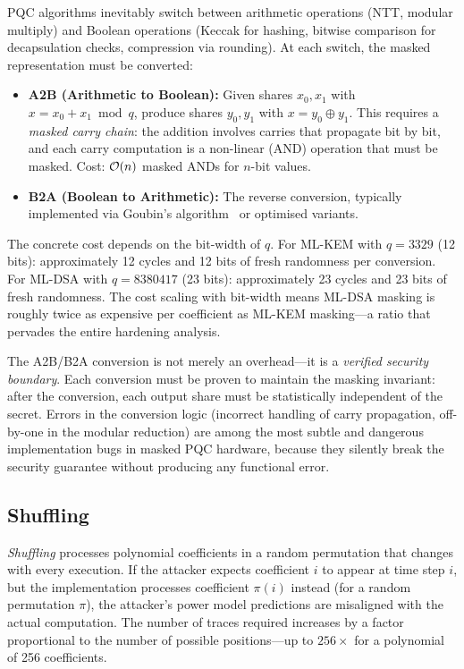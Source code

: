 PQC algorithms inevitably switch between arithmetic operations (NTT, modular multiply) and Boolean operations (Keccak for hashing, bitwise comparison for decapsulation checks, compression via rounding).  At each switch, the masked representation must be converted:

\begin{itemize}
\item \textbf{A2B (Arithmetic to Boolean):} Given shares $x_0, x_1$ with $x = x_0 + x_1 \bmod q$, produce shares $y_0, y_1$ with $x = y_0 \oplus y_1$.  This requires a \emph{masked carry chain}: the addition involves carries that propagate bit by bit, and each carry computation is a non-linear (AND) operation that must be masked.  Cost: $\mathcal{O}(n)$ masked ANDs for $n$-bit values.
\item \textbf{B2A (Boolean to Arithmetic):} The reverse conversion, typically implemented via Goubin's algorithm~\cite{Goubin2001} or optimised variants.
\end{itemize}

The concrete cost depends on the bit-width of $q$.  For ML-KEM with $q = 3329$ (12 bits): approximately 12 cycles and 12 bits of fresh randomness per conversion.  For ML-DSA with $q = 8380417$ (23 bits): approximately 23 cycles and 23 bits of fresh randomness.  The cost scaling with bit-width means ML-DSA masking is roughly twice as expensive per coefficient as ML-KEM masking---a ratio that pervades the entire hardening analysis.

The A2B/B2A conversion is not merely an overhead---it is a \emph{verified security boundary}.  Each conversion must be proven to maintain the masking invariant: after the conversion, each output share must be statistically independent of the secret.  Errors in the conversion logic (incorrect handling of carry propagation, off-by-one in the modular reduction) are among the most subtle and dangerous implementation bugs in masked PQC hardware, because they silently break the security guarantee without producing any functional error.


\subsection{Shuffling}
\label{subsec:shuffling}

\emph{Shuffling} processes polynomial coefficients in a random permutation that changes with every execution.  If the attacker expects coefficient $i$ to appear at time step $i$, but the implementation processes coefficient $\pi(i)$ instead (for a random permutation $\pi$), the attacker's power model predictions are misaligned with the actual computation.  The number of traces required increases by a factor proportional to the number of possible positions---up to $256\times$ for a polynomial of 256 coefficients.


